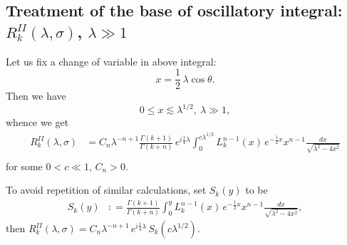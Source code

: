 \documentclass[11pt, reqno]{amsart}
\theoremstyle{plain}
\theoremstyle{remark}
\theoremstyle{example}
\theoremstyle{definition}
\numberwithin{equation}{section}
\begin{document}
\subsection*{Treatment of the base of oscillatory integral: $R_{k}^{II}(\lambda, \sigma)$, $\lambda \gg 1$}

Let us fix a change of variable in above integral:
\begin{equation}\label{x coords}
    x= \frac{1}{2} \, \lambda \cos{\theta}.
\end{equation}
Then we have 
\begin{equation*}
    0 \leq x \lesssim \lambda^{1/2}, \ \lambda \gg 1,
\end{equation*}
whence we get
\begin{equation}\label{x var. II Coeff. Rk as Laguerre integral}
   \begin{split}
        R_{k}^{II}(\lambda, \sigma)
        & = C_{n} \lambda^{-n +1} \frac{\Gamma(k+1)}{\Gamma(k+n)} \,  e^{i \frac{1}{4} \lambda}   \int_{0}^{c \lambda^{1/2}}  L_{k}^{n-1}(x) \, e^{-\frac{1}{2} x }  x^{n-1} \frac{dx}{\sqrt{\lambda^2 - 4 x^2}}\\
   \end{split}
\end{equation}
for some $0<c \ll 1$, $C_n>0$.

To avoid repetition of similar calculations, set $S_{k}(y)$ to be
\begin{equation}\label{factor of Rk}
    \begin{split}
        S_{k}(y)
        & : =  \frac{\Gamma(k+1)}{\Gamma(k+n)}  \int_{0}^{y}  L_{k}^{n-1}(x) \, e^{-\frac{1}{2} x }  x^{n-1} \frac{dx}{\sqrt{\lambda^2 - 4 x^2}},
   \end{split}
\end{equation}
then $R_{k}^{II}(\lambda, \sigma) = C_{n} \lambda^{-n + 1} \,  e^{i \frac{1}{4} \lambda} \, S_{k}(c \lambda^{1/2})$.
\end{document}
